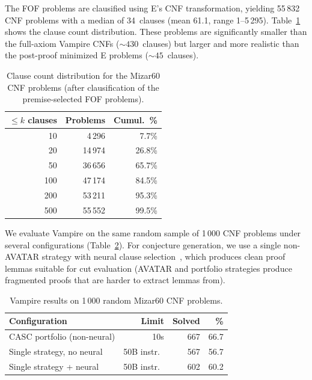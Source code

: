 \documentclass{easychair}
\newcommand{\Eprover}{E\xspace}
\newcommand{\Vampire}{Vampire\xspace}
\begin{document}
The FOF problems are clausified using \Eprover's CNF transformation,
yielding 55\,832 CNF problems with a median of 34~clauses (mean 61.1,
range 1--5\,295).  Table~\ref{tab:cnf-dist} shows the clause count
distribution.  These problems are significantly smaller than the
full-axiom \Vampire CNFs (${\sim}430$~clauses) but larger and more
realistic than the post-proof minimized \Eprover problems
(${\sim}45$~clauses).

\begin{table}[t]
\centering
\caption{Clause count distribution for the Mizar60 CNF problems
  (after clausification of the premise-selected FOF problems).}
\label{tab:cnf-dist}
\small
\begin{tabular}{rrr}
\toprule
$\leq k$ clauses & Problems & Cumul.\ \% \\
\midrule
10  &  4\,296 &  7.7\% \\
20  & 14\,974 & 26.8\% \\
50  & 36\,656 & 65.7\% \\
100 & 47\,174 & 84.5\% \\
200 & 53\,211 & 95.3\% \\
500 & 55\,552 & 99.5\% \\
\bottomrule
\end{tabular}
\end{table}

We evaluate \Vampire on the same random sample of 1\,000 CNF problems
under several configurations (Table~\ref{tab:vampire-configs}).
For conjecture generation, we use a single non-AVATAR strategy with
neural clause selection~\cite{Suda2025}, which produces clean
proof lemmas suitable for cut evaluation (AVATAR and portfolio
strategies produce fragmented proofs that are harder to extract
lemmas from).

\begin{table}[t]
\centering
\caption{\Vampire results on 1\,000 random Mizar60 CNF problems.}
\label{tab:vampire-configs}
\small
\begin{tabular}{lrrr}
\toprule
Configuration & Limit & Solved & \% \\
\midrule
CASC portfolio (non-neural) & 10s & 667 & 66.7 \\
Single strategy, no neural & 50B instr.\ & 567 & 56.7 \\
Single strategy + neural & 50B instr.\ & 602 & 60.2 \\
\bottomrule
\end{tabular}
\end{table}
\end{document}
